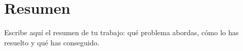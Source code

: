 \chapter{Resumen}

Escribe aquí el resumen de tu trabajo: qué problema abordas, cómo lo has
resuelto y qué has conseguido.

\mostrarPalabrasClave %
